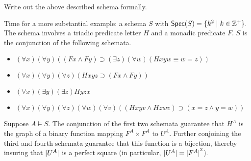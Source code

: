 \begin{aside}
    Write out the above described schema formally. 
\end{aside}

Time for a more substantial example: a schema $S$ with $\mbox{$\mathsf{Spec}(S)$}=\{k^2\mid k\in \mathbb{Z}^+\}$. The schema involves a triadic predicate letter $H$ and a monadic predicate $F$. $S$ is the conjunction of the following schemata.
\begin{itemize}
\item $(\forall x)(\forall y)((Fx\wedge Fy)\supset(\exists z)(\forall w)(Hxyw\equiv w=z))$
\item $(\forall x)(\forall y)(\forall z)(Hxyz\supset (Fx\wedge Fy))$
\item $(\forall x)(\exists y)(\exists z)Hyzx$
\item $(\forall x)(\forall y)(\forall z)(\forall w)(\forall v)((Hxyv\wedge Hzwv)\supset (x=z\wedge y=w))$
\end{itemize}
Suppose $A\models S$. The conjunction of the first two schemata guarantee that $H^A$ is the graph of a binary function mapping $F^A\times F^A$ to $U^A$. Further conjoining the third and fourth schemata guarantee that this function is a bijection, thereby insuring that $\mbox{$|U^A|$}$ is a perfect square (in particular, $\mbox{$|U^A|$} = \mbox{$|F^A|$}^2$).